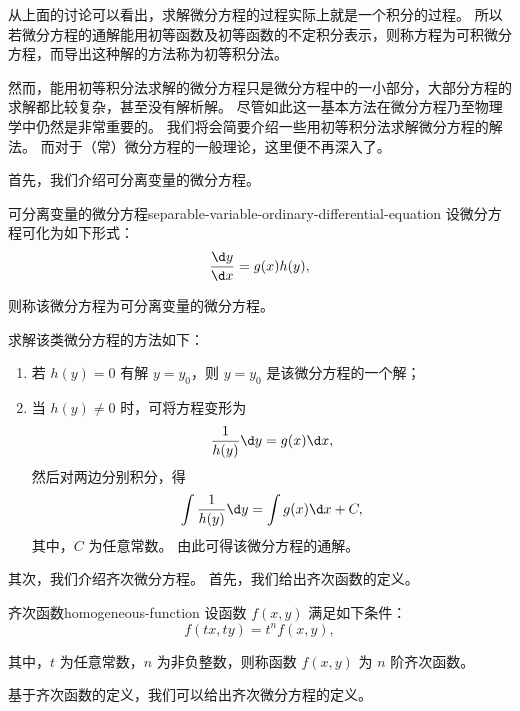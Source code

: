从上面的讨论可以看出，求解微分方程的过程实际上就是一个积分的过程。
所以若微分方程的通解能用初等函数及初等函数的不定积分表示，则称方程为可积微分方程，而导出这种解的方法称为初等积分法。

然而，能用初等积分法求解的微分方程只是微分方程中的一小部分，大部分方程的求解都比较复杂，甚至没有解析解。
尽管如此这一基本方法在微分方程乃至物理学中仍然是非常重要的。
我们将会简要介绍一些用初等积分法求解微分方程的解法。
而对于（常）微分方程的一般理论，这里便不再深入了。
\bigskip

首先，我们介绍可分离变量的微分方程。
\begin{definition}{可分离变量的微分方程}{separable-variable-ordinary-differential-equation}
    设微分方程可化为如下形式：
    \begin{equation}
        \frac{\d y}{\d x} = g(x) h(y),
    \end{equation}

    则称该微分方程为可分离变量的微分方程。
\end{definition}

求解该类微分方程的方法如下：
\begin{enumerate}
    \item 若 $ h(y) = 0 $ 有解 $ y = y_0 $，则 $ y = y_0 $ 是该微分方程的一个解；
    \item 当 $ h(y) \neq 0 $ 时，可将方程变形为
          \begin{equation}
              \frac{1}{h(y)} \d y = g(x) \d x,
          \end{equation}
          然后对两边分别积分，得
          \begin{equation}
              \int \frac{1}{h(y)} \d y = \int g(x) \d x + C,
          \end{equation}
          其中，$ C $ 为任意常数。
          由此可得该微分方程的通解。
\end{enumerate}
\bigskip

其次，我们介绍齐次微分方程。
首先，我们给出齐次函数的定义。
\begin{definition}{齐次函数}{homogeneous-function}
    设函数 $ f(x, y) $ 满足如下条件：
    \begin{equation}
        f(tx, ty) = t^n f(x, y),
    \end{equation}

    其中，$ t $ 为任意常数，$ n $ 为非负整数，则称函数 $ f(x, y) $ 为 $ n $ 阶齐次函数。
\end{definition}

基于齐次函数的定义，我们可以给出齐次微分方程的定义。

